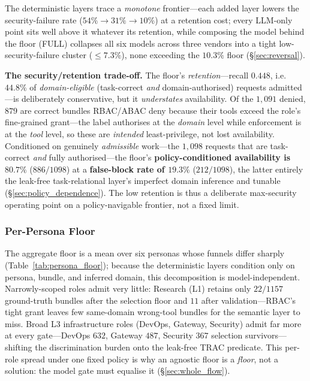 \documentclass[sigconf,review,anonymous]{acmart}
\begin{document}
The deterministic layers trace a \emph{monotone} frontier---each added layer lowers the security-failure rate ($54\%\!\to\!31\%\!\to\!10\%$) at a retention cost; every LLM-only point sits well above it whatever its retention, while composing the model behind the floor (FULL) collapses all six models across three vendors into a tight low-security-failure cluster ($\leq7.3\%$), none exceeding the $10.3\%$ floor (\S\ref{sec:reversal}).

\textbf{The security/retention trade-off.} The floor's \emph{retention}---recall $0.448$, i.e.\ $44.8\%$ of \emph{domain-eligible} (task-correct \emph{and} domain-authorised) requests admitted---is deliberately conservative, but it \emph{understates} availability. Of the $1{,}091$ denied, $879$ are correct bundles RBAC/ABAC deny because their tools exceed the role's fine-grained grant---the label authorises at the \emph{domain} level while enforcement is at the \emph{tool} level, so these are \emph{intended} least-privilege, not lost availability. Conditioned on genuinely \emph{admissible} work---the $1{,}098$ requests that are task-correct \emph{and} fully authorised---the floor's \textbf{policy-conditioned availability is $80.7\%$} ($886/1098$) at a \textbf{false-block rate of $19.3\%$} ($212/1098$), the latter entirely the leak-free task-relational layer's imperfect domain inference and tunable (\S\ref{sec:policy_dependence}). The low retention is thus a deliberate max-security operating point on a policy-navigable frontier, not a fixed limit.

\subsubsection{Per-Persona Floor}
\label{sec:persona_floor}

The aggregate floor is a mean over six personas whose funnels differ sharply (Table~\ref{tab:persona_floor}); because the deterministic layers condition only on persona, bundle, and inferred domain, this decomposition is model-independent. Narrowly-scoped roles admit very little: Research (L1) retains only $22/1157$ ground-truth bundles after the selection floor and $11$ after validation---RBAC's tight grant leaves few same-domain wrong-tool bundles for the semantic layer to miss. Broad L3 infrastructure roles (DevOps, Gateway, Security) admit far more at every gate---DevOps $632$, Gateway $487$, Security $367$ selection survivors---shifting the discrimination burden onto the leak-free TRAC predicate. This per-role spread under one fixed policy is why an agnostic floor is a \emph{floor}, not a solution: the model gate must equalise it (\S\ref{sec:whole_flow}).
\end{document}
